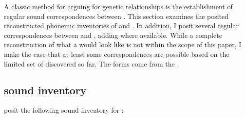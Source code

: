 \documentclass[output=paper]{LSP/langsci}
\begin{document}
A classic method for arguing for genetic relationships is the establishment of regular sound correspondences between . This section examines the posited reconstructed phonemic inventories of  and . In addition, I posit several regular correspondences between  and , adding   where available. While a complete reconstruction of what a  would look like is not within the scope of this paper, I make the case that at least some correspondences are possible based on the limited set of  discovered so far. The  forms come from the  \citep{Rankinetal2015AccessSeptember}.

\subsection{ sound inventory}

\citet{RankinetalND} posit the following sound inventory for :
\end{document}
